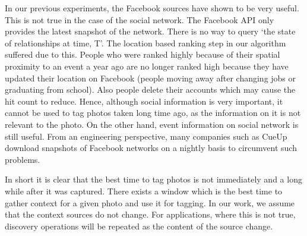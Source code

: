 In our previous experiments, the Facebook sources have shown to be very useful. This is not true in the case of the social network. The Facebook API only provides the latest snapshot of the network. There is no way to query `the state of relationships at time, T'. The location based ranking step in our algorithm suffered due to this. People who were ranked highly because of their spatial proximity to an event a year ago are no longer ranked high because they have updated their location on Facebook (people moving away after changing jobs or graduating from school). Also people delete their accounts which may cause the hit count to reduce. Hence, although social information is very important, it cannot be used to tag photos taken long time ago, as the information on it is not relevant to the photo. On the other hand, event information on social network is still useful. From an engineering perspective, many companies such as CueUp download snapshots of Facebook networks on a nightly basis to circumvent such problems.

In short it is clear that the best time to tag photos is not immediately and a long while after it was captured. There exists a window which is the best time to gather context for a given photo and use it for tagging. In our work, we assume that the context sources do not change. For applications, where this is not true, discovery operations will be repeated as the content of the source change. 



